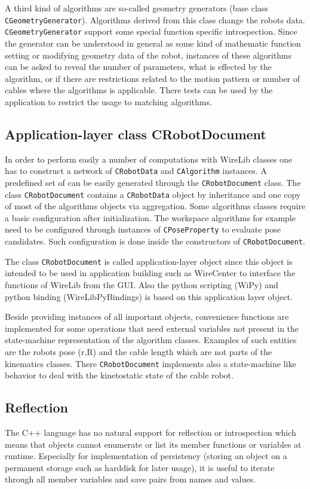 \documentclass[11pt,a4paper,onepage,openany]{book}
\begin{document}
A third kind of algorithms are so-called geometry generators (base class
\texttt{CGeometryGenerator}). Algorithms derived from this class change the
robots data. \texttt{CGeometryGenerator} support some special function specific
introspection. Since the generator can be understood in general as some kind of
mathematic function setting or modifying geometry data of the robot, instances
of these algorithms can be asked to reveal the number of parameters, what is
effected by the algorithm, or if there are restrictions related to the motion
pattern or number of cables where the algorithms is applicable. There tests can
be used by the application to restrict the usage to matching algorithms.

\subsection{Application-layer class CRobotDocument}
In order to perform easily a number of computations with WireLib classes one
has to construct a network of \texttt{CRobotData} and \texttt{CAlgorithm}
instances. A predefined set of can be easily generated through the
\texttt{CRobotDocument} class. The class \texttt{CRobotDocument} contains a
\texttt{CRobotData} object by inheritance and one copy of most of the
algorithms objects via aggregation. Some algorithms classes require a basic
configuration after initialization. The workspace algorithms for example need
to be configured through instances of \texttt{CPoseProperty} to evaluate pose
candidates. Such configuration is done inside the constructors of
\texttt{CRobotDocument}.

The class \texttt{CRobotDocument} is called application-layer object since this
object is intended to be used in application building such as WireCenter to
interface the functions of WireLib from the GUI. Also the python scripting
(WiPy) and python binding (WireLibPyBindings) is based on this application
layer object.

Beside providing instances of all important objects, convenience functions are
implemented for some operations that need external variables not present in the
state-machine representation of the algorithm classes. Examples of such
entities are the robots pose (r,R) and the cable length which are not parts of
the kinematics classes. There \texttt{CRobotDocument} implements also a
state-machine like behavior to deal with the kinetostatic state of the cable
robot.

\subsection{Reflection}
The C++ language has no natural support for reflection or introspection which
means that objects cannot enumerate or list its member functions or variables
at runtime. Especially for implementation of persistency (storing an object on
a permanent storage such as harddisk for later usage), it is useful to iterate
through all member variables and save pairs from names and values.
\end{document}
